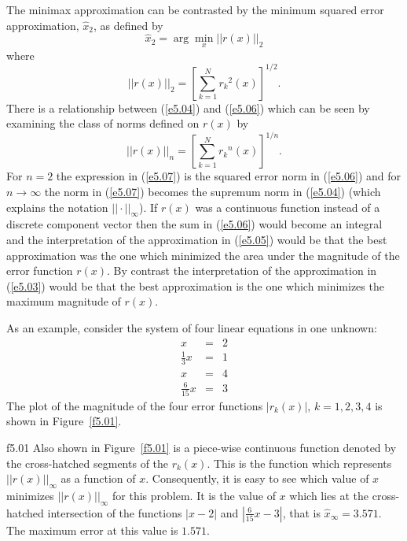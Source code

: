      The minimax approximation can be 
contrasted by the minimum squared error approximation,
$\hat{x}_2$, as defined by
%
\begin{equation}
\hat{x}_2=\arg\min_x ||r(x)||_2
\label{e5.05}
\end{equation}
%
where
%
\begin{equation}
||r(x)||_2=[\sum_{k=1}^{N}{r_k}^2(x)]^{1/2}.
\label{e5.06}
\end{equation}
%
There is a relationship between (\ref{e5.04}) and (\ref{e5.06}) which
can be seen by examining the class of norms defined on $r(x)$ by
%
\begin{equation}
||r(x)||_n=[\sum_{k=1}^{N}{r_k}^n(x)]^{1/n}.
\label{e5.07}
\end{equation}
%
For $n=2$ the expression in (\ref{e5.07}) is the squared error
norm in (\ref{e5.06}) and for $n\rightarrow \infty$ the norm in (\ref{e5.07})
becomes the supremum norm in (\ref{e5.04}) (which explains the 
notation $||\cdot||_{\infty}$).  If
$r(x)$ was a continuous function instead of a discrete
component vector then the sum in (\ref{e5.06}) would become an
integral and the interpretation of the approximation in 
(\ref{e5.05}) would be that
the best approximation was the one which minimized
the area under the magnitude of the error function $r(x)$.
By contrast the interpretation of the approximation in (\ref{e5.03})
would be that the best approximation is the one which minimizes the maximum
magnitude of $r(x)$.

	As an example, consider the system of four linear
equations in one unknown:
%
\begin{eqnarray}
x&=&2\nonumber\\
\frac{1}{3}x&=&1\nonumber\\
x&=&4\nonumber\\
\frac{6}{15}x&=&3
\label{e5.08}
\end{eqnarray}
%
The plot of the magnitude of the four error functions
$|r_k(x)|$, $k=1,2,3,4$ is shown in Figure~\ref{f5.01}.
%

{f5.01}
%
Also shown in Figure~\ref{f5.01} is a piece-wise continuous
function denoted by the cross-hatched segments of the $r_k(x)$.  This
is the function which represents $||r(x)||_{\infty}$ as a function
of $x$.  Consequently, it is easy to see which value
of $x$ minimizes $||r(x)||_{\infty}$ for this problem.  It is
the value of $x$ which lies at the cross-hatched intersection of the
functions $|x-2|$ and $|\frac{6}{15}x-3|$,  that is 
$\hat{x}_{\infty}=3.571$.  The maximum error at this value is 
$1.571$.

